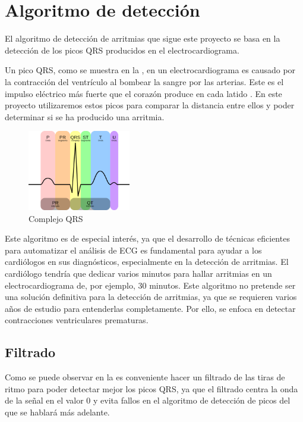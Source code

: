 \section{Algoritmo de detección}
El algoritmo de detección de arritmias que sigue este proyecto se basa en la detección de 
los picos QRS producidos en el electrocardiograma.

Un pico QRS, como se muestra en la , en un electrocardiograma es causado por la contracción del ventrículo al bombear la sangre por las arterias. Este es el impulso eléctrico más fuerte que el corazón produce en cada latido \cite{wiki:QRS_complex}. En este proyecto utilizaremos estos picos para comparar la distancia entre ellos y poder determinar si se ha producido una arritmia. 

\begin{figure}[h]
	\centering
	\includegraphics[width=0.4\textwidth]{./Images/img_introduccion/complejoQRS.png}
	\caption[Complejo QRS]{Complejo QRS \cite{desai2021low}}
	\label{fig:complejoQRS}
\end{figure}

Este algoritmo es de especial interés\cite{kiranyaz2011personalized}, ya que el desarrollo de técnicas eficientes para automatizar el análisis de ECG es fundamental para ayudar a los cardiólogos en sus diagnósticos, especialmente en la detección de arritmias. El cardiólogo tendría que dedicar varios minutos para hallar arritmias en un electrocardiograma de, por ejemplo, 30 minutos. Este algoritmo no pretende ser una solución definitiva para la detección de arritmias, ya que se requieren varios años de estudio para entenderlas completamente. Por ello, se enfoca en detectar contracciones ventriculares prematuras.

\subsection{Filtrado}
Como se puede observar en la  es conveniente hacer un filtrado de las tiras de ritmo para poder detectar mejor los picos QRS, ya que el filtrado centra la onda de la señal en el valor 0 y evita fallos en el algoritmo de detección de picos del que se hablará más adelante. 

